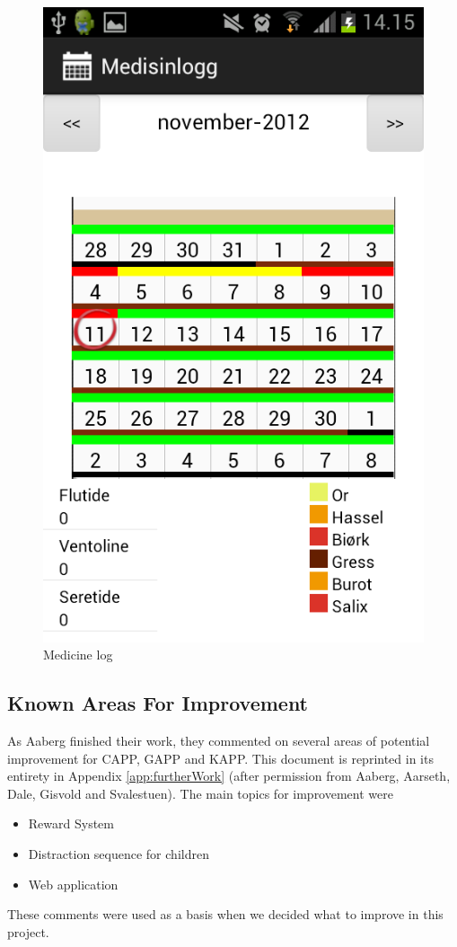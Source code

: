 \begin{figure}[H]
\begin{minipage}[b]{0.4\linewidth}
		\includegraphics[width=0.20\paperwidth]{Pictures/app-screenshots/logg.png}
		\caption{Medicine log}
		\label{fig:medicine-log}
	\end{minipage}
	
\end{figure}

\subsection{Known Areas For Improvement}
\label{sec:improvements}
As Aaberg \etal{} finished their work, they commented on several areas of potential improvement for CAPP, GAPP and KAPP. This document is reprinted in its entirety in Appendix \ref{app:furtherWork} (after permission from Aaberg, Aarseth, Dale, Gisvold and Svalestuen). The main topics for improvement were
\begin{itemize}
\item{Reward System}
\item{Distraction sequence for children}
\item{Web application}
\end{itemize}


These comments were used as a basis when we decided what to improve in this project. 




